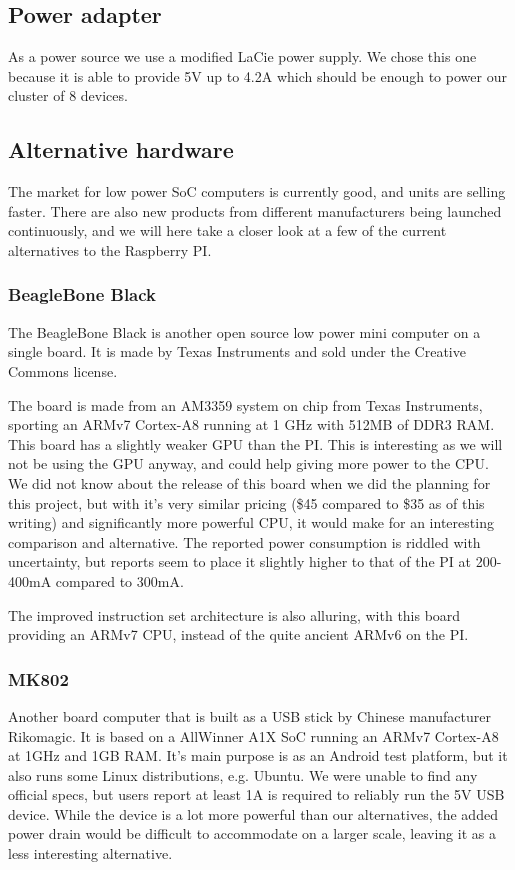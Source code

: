 \subsection{Power adapter}
As a power source we use a modified LaCie power supply. We chose this one because it is able to provide 5V up to 4.2A which should be enough to power our cluster of 8 devices.

\subsection{Alternative hardware}
The market for low power SoC computers is currently good, and units are selling faster\cite{growing_market}.
There are also new products from different manufacturers being launched continuously, and we will here take a closer look at a few of the current alternatives to the Raspberry PI.

\subsubsection{BeagleBone Black}
The BeagleBone Black is another open source low power mini computer on a single board. It is made by Texas Instruments and sold under the Creative Commons license.

The board is made from an AM3359 system on chip from Texas Instruments, sporting an ARMv7 Cortex-A8 running at 1 GHz with 512MB of DDR3 RAM. This board has a slightly weaker GPU than the PI. This is interesting as we will not be using the GPU anyway, and could help giving more power to the CPU.
We did not know about the release of this board when we did the planning for this project, but with it's very similar pricing (\$45 compared to \$35 as of this writing) and significantly more powerful CPU, it would make for an interesting comparison and alternative. The reported power consumption is riddled with uncertainty, but reports seem to place it slightly higher to that of the PI at 200-400mA compared to 300mA.

The improved instruction set architecture is also alluring, with this board providing an ARMv7 CPU, instead of the quite ancient ARMv6 on the PI.

\subsubsection{MK802}
Another board computer that is built as a USB stick by Chinese manufacturer Rikomagic.
It is based on a AllWinner A1X SoC running an ARMv7 Cortex-A8 at 1GHz and 1GB RAM. It's main purpose is as an Android test platform, but it also runs some Linux distributions, e.g. Ubuntu.
We were unable to find any official specs, but users report at least 1A is required to reliably run the 5V USB device. 
While the device is a lot more powerful than our alternatives, the added power drain would be difficult to accommodate on a larger scale, leaving it as a less interesting alternative.

